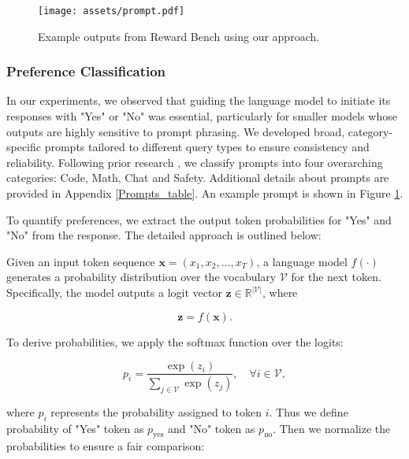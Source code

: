 \begin{figure}[h]
    \centering
    \texttt{[image: assets/prompt.pdf]}
    \caption{Example outputs from Reward Bench using our approach.}
    \label{Sample_Prompts}
\end{figure}



\subsubsection{Preference Classification}
\label{Preference Modeling}

In our experiments, we observed that guiding the language model to initiate its responses with "Yes" or "No" was essential, particularly for smaller models whose outputs are highly sensitive to prompt phrasing. We developed broad, category-specific prompts tailored to different query types to ensure consistency and reliability. Following prior research \citep{lambert2024rewardbenchevaluatingrewardmodels, liu2024rmbenchbenchmarkingrewardmodels}, we classify prompts into four overarching categories: Code, Math, Chat and Safety. Additional details about prompts are provided in Appendix \ref{Prompts_table}. An example prompt is shown in Figure \ref{Sample_Prompts}.

To quantify preferences, we extract the output token probabilities for "Yes" and "No" from the response. The detailed approach is outlined below:

Given an input token sequence \( \mathbf{x} = (x_1, x_2, \dots, x_T) \), a language model \( f(\cdot) \) generates a probability distribution over the vocabulary \( \mathcal{V} \) for the next token. Specifically, the model outputs a logit vector \( \mathbf{z} \in \mathbb{R}^{|\mathcal{V}|} \), where  

\begin{equation}
\mathbf{z} = f(\mathbf{x}).
\end{equation}

To derive probabilities, we apply the softmax function over the logits:  

\begin{equation}
p_i = \frac{\exp(z_i)}{\sum_{j \in \mathcal{V}} \exp(z_j)}, \quad \forall i \in \mathcal{V},
\end{equation}

where \( p_i \) represents the probability assigned to token \( i \). Thus we define probability of "Yes" token as $p_{\text{yes}}$ and "No" token as $p_{\text{no}}$. Then we normalize the probabilities to ensure a fair comparison:

